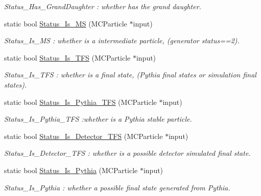 \begin{DoxyCompactItemize}
\begin{DoxyCompactList}\small\item\em Status\_\-Has\_\-GrandDaughter : whether has the grand daughter. \item\end{DoxyCompactList}\item 
static bool \hyperlink{classToolSet_1_1CMC_ae0ceba81f34f1a164b1d8ce719c92e05}{Status\_\-Is\_\-MS} (MCParticle $\ast$input)
\begin{DoxyCompactList}\small\item\em Status\_\-Is\_\-MS : whether is a intermediate particle, (generator status==2). \item\end{DoxyCompactList}\item 
static bool \hyperlink{classToolSet_1_1CMC_a662c5f9d64c7916f988e4ff15598d4ed}{Status\_\-Is\_\-TFS} (MCParticle $\ast$input)
\begin{DoxyCompactList}\small\item\em Status\_\-Is\_\-TFS : whether is a final state, (Pythia final states or simulation final states). \item\end{DoxyCompactList}\item 
static bool \hyperlink{classToolSet_1_1CMC_aef5a206838a69936e98ea22a1c36e143}{Status\_\-Is\_\-Pythia\_\-TFS} (MCParticle $\ast$input)
\begin{DoxyCompactList}\small\item\em Status\_\-Is\_\-Pythia\_\-TFS :whether is a Pythia stable particle. \item\end{DoxyCompactList}\item 
static bool \hyperlink{classToolSet_1_1CMC_a23a38c3094037dd6660223494c8a5827}{Status\_\-Is\_\-Detector\_\-TFS} (MCParticle $\ast$input)
\begin{DoxyCompactList}\small\item\em Status\_\-Is\_\-Detector\_\-TFS : whether is a possible detector simulated final state. \item\end{DoxyCompactList}\item 
static bool \hyperlink{classToolSet_1_1CMC_a3fbb915477cbbdca4193b8b2ff8cd356}{Status\_\-Is\_\-Pythia} (MCParticle $\ast$input)
\begin{DoxyCompactList}\small\item\em Status\_\-Is\_\-Pythia : whether a possible final state generated from Pythia. \item\end{DoxyCompactList}\item 

\end{DoxyCompactItemize}
